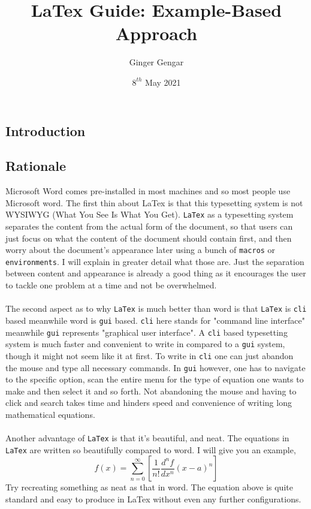 \documentclass[a4paper, 12pt]{report}
\begin{document}
\title{LaTex Guide: Example-Based Approach}
\author{Ginger Gengar}
\date{$8^{th}$ May 2021}
\maketitle
\newpage

\tableofcontents
\newpage

\begin{center}
\section{Introduction}
\begin{comment}
\end{comment}

\subsection{Rationale} \label{rationale}
\begin{comment}
\end{comment}
Microsoft Word comes pre-installed in most machines and so most people use Microsoft word. The first thin about LaTex is that this typesetting system is not WYSIWYG (What You See Is What You Get). \texttt{LaTex} as a typesetting system separates the content from the actual form of the document, so that users can just focus on what the content of the document should contain first, and then worry about the document's appearance later using a bunch of \texttt{macros} or \texttt{environments}. I will explain in greater detail what those are. Just the separation between content and appearance is already a good thing as it encourages the user to tackle one problem at a time and not be overwhelmed. 
\\~\\The second aspect as to why \texttt{LaTex} is much better than word is that \texttt{LaTex} is \texttt{cli} based meanwhile word is \texttt{gui} based. \texttt{cli} here stands for "command line interface" meanwhile \texttt{gui} represents "graphical user interface". A \texttt{cli}  based typesetting system is much faster and convenient to write in compared to a \texttt{gui} system, though it might not seem like it at first. To write in \texttt{cli} one can just abandon the mouse and type all necessary commands. In \texttt{gui} however, one has to navigate to the specific option, scan the entire menu for the type of equation one wants to make and then select it and so forth. Not abandoning the mouse and having to click and search takes time and hinders speed and convenience of writing long mathematical equations. 
\\~\\Another advantage of \texttt{LaTex} is that it's beautiful, and neat. The equations in \texttt{LaTex} are written so beautifully compared to word. I will give you an example,
$$f(x) = \sum^{\infty}_{n = 0}\left[\frac{1}{n!}\frac{d^{n}f}{dx^{n}}(x-a)^{n}\right]$$
Try recreating something as neat as that in word. The equation above is quite standard and easy to produce in LaTex without even any further configurations. 


\end{center}
\end{document}
